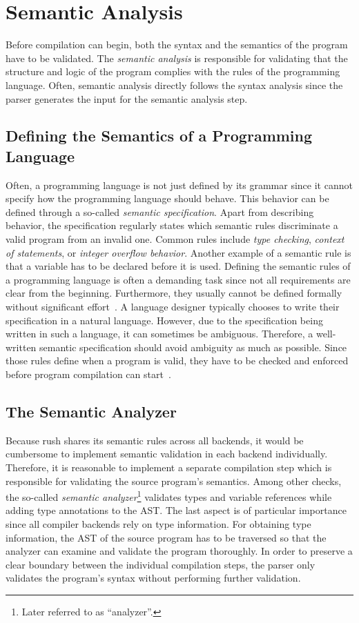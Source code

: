 \section{Semantic Analysis}
Before compilation can begin, both the syntax and the semantics of the program have to be validated.
The \emph{semantic analysis} is responsible for validating that the structure and logic of the program complies with the rules of the programming language.
Often, semantic analysis directly follows the syntax analysis since the parser generates the input for the semantic analysis step.

\subsection{Defining the Semantics of a Programming Language}
Often, a programming language is not just defined by its grammar
since it cannot specify how the programming language should behave.
This behavior can be defined through a so-called \emph{semantic specification}.
Apart from describing behavior, the specification regularly states which semantic rules discriminate a valid program from an invalid one.
Common rules include \emph{type checking}, \emph{context of statements}, or \emph{integer overflow behavior}.
Another example of a semantic rule is that a variable has to be declared before it is used.
Defining the semantic rules of a programming language is often a demanding task
since not all requirements are clear from the beginning.
Furthermore, they usually cannot be defined formally without significant effort~\cite[pp.~5f]{Holm2012}.
A language designer typically chooses to write their specification in a natural language.
However, due to the specification being written in such a language, it can sometimes be ambiguous.
Therefore, a well-written semantic specification should avoid ambiguity as much as possible.
Since those rules define when a program is valid, they have to be checked and enforced before program compilation can start~\cite[p.~21]{Watson2017}.

\subsection{The Semantic Analyzer}
Because rush shares its semantic rules across all backends, it would be cumbersome to implement semantic validation in each backend individually.
Therefore, it is reasonable to implement a separate compilation step which is responsible for validating the source program's semantics.
Among other checks, the so-called \emph{semantic analyzer}\footnote{Later referred to as \enquote{analyzer}.} validates types and variable references while adding type annotations to the AST\@.
The last aspect is of particular importance since all compiler backends rely on type information.
For obtaining type information, the AST of the source program has to be traversed so that the analyzer can examine and validate the program thoroughly.
In order to preserve a clear boundary between the individual compilation steps, the parser
only validates the program's syntax without performing further validation.

